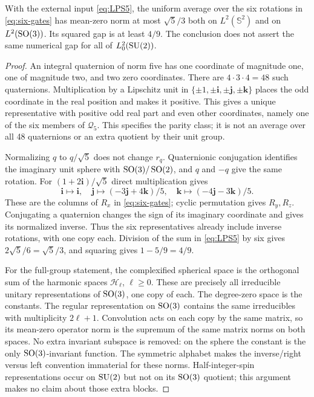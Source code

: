 \begin{proposition}
\label{prop:lps-transfer39}
With the external input \eqref{eq:LPS5}, the uniform average over the
six rotations in \eqref{eq:six-gates} has mean-zero norm at most
$\sqrt5/3$ both on $L^2(\mathbb S^2)$ and on $L^2(\operatorname{SO}(3))$.
Its squared gap is at least $4/9$. The conclusion does not assert
the same numerical gap for all of $L^2_0(\operatorname{SU}(2))$.
\end{proposition}
\begin{proof}
An integral quaternion of norm five has one coordinate of magnitude
one, one of magnitude two, and two zero coordinates. There are
$4\cdot3\cdot4=48$ such quaternions. Multiplication by a Lipschitz
unit in $\{\pm1,\pm\mathbf i,\pm\mathbf j,\pm\mathbf k\}$
places the odd coordinate in the real position and makes it positive.
This gives a unique representative with positive odd real part and
even other coordinates, namely one of the six members of $\mathscr Q_5$.
This specifies the parity class; it is not an average over all 48
quaternions or an extra quotient by their unit group.

Normalizing $q$ to $q/\sqrt5$ does not change $r_q$. Quaternionic
conjugation identifies the imaginary unit sphere with
$\operatorname{SO}(3)/\operatorname{SO}(2)$, and $q$ and $-q$ give the same rotation.
For $(1+2\mathbf i)/\sqrt5$ direct multiplication gives
\[
 \mathbf i\mapsto\mathbf i,\quad
 \mathbf j\mapsto(-3\mathbf j+4\mathbf k)/5,\quad
 \mathbf k\mapsto(-4\mathbf j-3\mathbf k)/5.
\]
These are the columns of $R_x$ in \eqref{eq:six-gates}; cyclic
permutation gives $R_y,R_z$. Conjugating a quaternion changes the
sign of its imaginary coordinate and gives its normalized inverse.
Thus the six representatives already include inverse rotations, with
one copy each. Division of the sum in \eqref{eq:LPS5} by six gives
$2\sqrt5/6=\sqrt5/3$, and squaring gives $1-5/9=4/9$.

For the full-group statement, the complexified spherical space is the
orthogonal sum of the harmonic spaces $\mathcal H_\ell$, $\ell\ge0$.
These are precisely all irreducible unitary representations of
$\operatorname{SO}(3)$, one copy of each. The degree-zero space is the constants.
The regular representation on $\operatorname{SO}(3)$ contains the same irreducibles
with multiplicity $2\ell+1$. Convolution acts on each copy by the
same matrix, so its mean-zero operator norm is the supremum of the
same matrix norms on both spaces. No extra invariant subspace is
removed: on the sphere the constant is the only $\operatorname{SO}(3)$-invariant
function. The symmetric alphabet makes the inverse/right versus
left convention immaterial for these norms. Half-integer-spin
representations occur on $\operatorname{SU}(2)$ but not on its $\operatorname{SO}(3)$ quotient;
this argument makes no claim about those extra blocks.
\end{proof}


